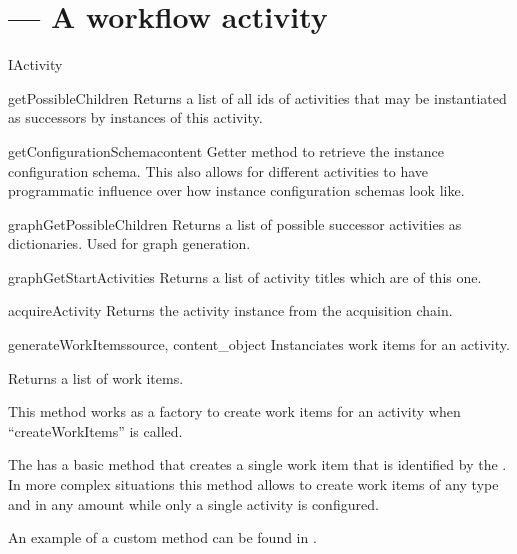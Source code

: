   \section{ --- A workflow activity}

     
    \begin{classdesc}{IActivity}{}
       
      \begin{funcdesc}{getPossibleChildren}{}
        Returns a list of all ids of activities that may be 
        instantiated as successors by instances of this activity.
      \end{funcdesc}

      \begin{funcdesc}{getConfigurationSchema}{content}
        Getter method to retrieve the instance configuration schema. This also 
        allows for different activities to have programmatic influence 
        over how instance configuration schemas look like.
      \end{funcdesc}

      \begin{funcdesc}{graphGetPossibleChildren}{}
        Returns a list of possible successor activities as dictionaries. Used
        for graph generation.
      \end{funcdesc}

      \begin{funcdesc}{graphGetStartActivities}{}
        Returns a list of activity titles which are 
         of this one.
      \end{funcdesc}

      \begin{funcdesc}{acquireActivity}{}
        Returns the activity instance from the acquisition chain.
      \end{funcdesc}

      \begin{funcdesc}{generateWorkItems}{source, content\_object}
        Instanciates work items for an activity. 

        Returns a list of work items.

        This method works as a factory to create work items for an activity
        when ``createWorkItems'' is called.

        The  has a basic method that creates a single work
        item that is identified by the . In more complex situations 
        this method allows to create work items of any type and in any amount
        while only a single activity is configured.

        An example of a custom  method can be found
        in .
      \end{funcdesc}
    \end{classdesc}


